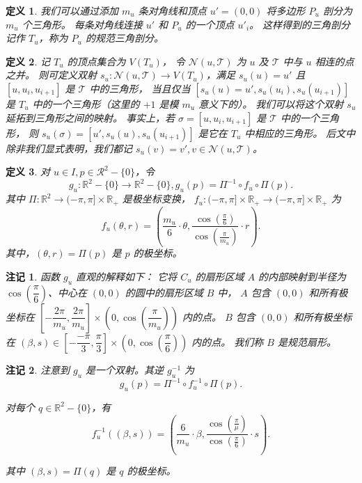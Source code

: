 \documentclass{ctexart}
\newtheorem{Def}{定义}
\newtheorem{Rmk}{注记}
\begin{document}
		\begin{Def}
			我们可以通过添加 $m_u$ 条对角线和顶点 $u'=(0,0)$ 将多边形 $P_u$ 剖分为 $m_u$ 个三角形。
			每条对角线连接 $u'$ 和 $P_u$ 的一个顶点 $u'_i$。
			这样得到的三角剖分记作 $T_u$，称为 $P_u$ 的规范三角剖分。				
		\end{Def}

		\begin{Def}
			记 $T_u$ 的顶点集合为 $V(T_u)$，
			令 $\mathcal{N}(u,\mathcal{T})$ 为 $u$ 及 $\mathcal{T}$ 中与 $u$ 相连的点之并。
			则可定义双射 $s_u:\mathcal{N}(u,\mathcal{T})\rightarrow V(T_u)$，满足 $s_u(u)=u'$
			且 $[u,u_i,u_{i+1}]$ 是 $\mathcal{T}$ 中的三角形，
			当且仅当 $[s_u(u)=u',s_u(u_i),s_u(u_{i+1})]$ 是 $T_u$ 中的一个三角形（这里的 $+1$ 是模 $m_u$ 意义下的）。
			我们可以将这个双射 $s_u$ 延拓到三角形之间的映射。
			事实上，若 $\sigma = [u,u_i,u_{i+1}]$ 是 $\mathcal{T}$ 中的一个三角形，
			则 $s_u(\sigma) = [u',s_u(u),s_u(u_{i+1})]$ 是它在 $T_u$ 中相应的三角形。
			后文中除非我们显式表明，我们都记 $s_u(v)=v',v\in \mathcal{N}(u,\mathcal{T})$。
		\end{Def}

		\begin{Def}
			对 $u\in I,p\in \mathcal{R}^2-\{0\}$，令
			\begin{equation}
				g_u:\mathbb{R}^2-\{0\}\rightarrow \mathbb{R}^2-\{0\},g_u(p) = \Pi^{-1}\circ f_u\circ \Pi(p).
			\end{equation}
			其中 $\Pi:\mathbb{R}^2\rightarrow (-\pi,\pi]\times \mathbb{R}_+$ 是极坐标变换，
			$f_u:(-\pi,\pi]\times \mathbb{R}_+\rightarrow (-\pi,\pi]\times \mathbb{R}_+$ 为
			\begin{equation}
				f_u(\theta,r) = (\dfrac{m_u}6 \cdot \theta, \dfrac{\cos(\frac{\pi}6)}{\cos(\frac{\pi}{m_u})}\cdot r).
			\end{equation}
			其中，$(\theta,r)=\Pi(p)$ 是 $p$ 的极坐标。				
		\end{Def}

		\begin{Rmk}
			函数 $g_u$ 直观的解释如下：
			它将 $C_u$ 的扇形区域 $A$ 的内部映射到半径为 $\cos(\dfrac{\pi}6)$、中心在 $(0,0)$ 的圆中的扇形区域 $B$ 中，
			$A$ 包含 $(0,0)$ 和所有极坐标在 $[-\dfrac{2\pi}{m_u},\dfrac{2\pi}{m_u}]\times (0,\cos(\dfrac{\pi}{m_u}))$ 内的点。
			$B$ 包含 $(0,0)$ 和所有极坐标在 $(\beta,s)\in [-\dfrac{-\pi}3,\dfrac{\pi}3]\times (0,\cos(\dfrac{\pi}6))$ 内的点。
			我们称 $B$ 是规范扇形。
		\end{Rmk}

		\begin{Rmk}
			注意到 $g_u$ 是一个双射。其逆 $g_u^{-1}$ 为
			\begin{equation}
				g_u(p) = \Pi^{-1}\circ f_u^{-1}\circ \Pi(p).
			\end{equation}
	
			对每个 $q\in \mathbb{R}^2-\{0\}$，有
			\begin{equation}
				f_u^{-1}((\beta,s)) = (\dfrac 6{m_u}\cdot \beta,\dfrac{\cos(\frac{\pi}{\mu})}{\cos(\frac{\pi}6)}\cdot s).
			\end{equation}
	
			其中 $(\beta,s) = \Pi(q)$ 是 $q$ 的极坐标。
		\end{Rmk}
\end{document}

